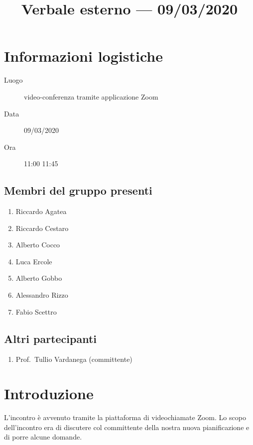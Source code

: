 \documentclass{article}
\title{Verbale esterno --- 09/03/2020}
\begin{document}


\section{Informazioni logistiche}%
\label{sec:informazioni_logistiche}

\begin{description}
  \item [Luogo] video-conferenza tramite applicazione Zoom
  \item [Data] 09/03/2020
  \item [Ora] 11:00  11:45
\end{description}

\subsection{Membri del gruppo presenti}%
\label{sub:membri_del_gruppo_presenti}

\begin{enumerate}
  \item Riccardo Agatea
  \item Riccardo Cestaro
  \item Alberto Cocco
  \item Luca Ercole
  \item Alberto Gobbo
  \item Alessandro Rizzo
  \item Fabio Scettro
\end{enumerate}


\subsection{Altri partecipanti}%
\label{sub:altri_partecipanti}

\begin{enumerate}
  \item Prof.\ Tullio Vardanega (committente)
\end{enumerate}


\section{Introduzione}%
\label{sec:introduzione}

L'incontro è avvenuto tramite la piattaforma di videochiamate Zoom.
Lo scopo dell'incontro era di discutere col committente della nostra nuova pianificazione e di porre alcune domande.
\end{document}

